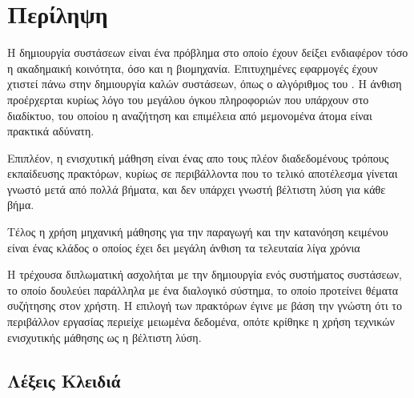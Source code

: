 \maketitle

\blankpagecount

\examinationpage

\copyrightspage

\justifying


\chapter*{Περίληψη}
Η δημιουργία συστάσεων είναι ένα πρόβλημα στο οποίο έχουν δείξει 
ενδιαφέρον τόσο η ακαδημαική κοινότητα, όσο και η βιομηχανία. Επιτυχημένες εφαρμογές έχουν χτιστεί πάνω στην δημιουργία καλών 
συστάσεων, όπως ο αλγόριθμος του . Η άνθιση προέρχερται κυρίως λόγο του μεγάλου όγκου πληροφοριών που υπάρχουν στο
διαδίκτυο, του οποίου η αναζήτηση και επιμέλεια από μεμονομένα άτομα είναι πρακτικά αδύνατη. 

\noindent
Επιπλέον, η ενισχυτική 
μάθηση είναι ένας απο τους πλέον διαδεδομένους τρόπους εκπαίδευσης 
πρακτόρων, κυρίως σε περιβάλλοντα που το τελικό αποτέλεσμα γίνεται
γνωστό μετά από πολλά βήματα, και δεν υπάρχει γνωστή βέλτιστη λύση για κάθε βήμα.

\noindent
Τέλος η χρήση μηχανική μάθησης για την παραγωγή και την κατανόηση
κειμένου είναι ένας κλάδος ο οποίος έχει δει μεγάλη άνθιση τα
τελευταία λίγα χρόνια 

\noindent
Η τρέχουσα διπλωματική ασχολήται με την δημιουργία ενός συστήματος συστάσεων, το οποίο δουλεύει παράλληλα με ένα διαλογικό σύστημα, το 
οποίο προτείνει θέματα συζήτησης στον χρήστη. Η επιλογή των πρακτόρων
έγινε με βάση την γνώστη ότι το περιβάλλον εργασίας περιείχε μειωμένα δεδομένα, οπότε κρίθηκε η χρήση τεχνικών ενισχυτικής μάθησης ως η βέλτιστη λύση. 
\vspace{20ex}
\section*{Λέξεις Κλειδιά}


\clearpage

\blankpagecount

